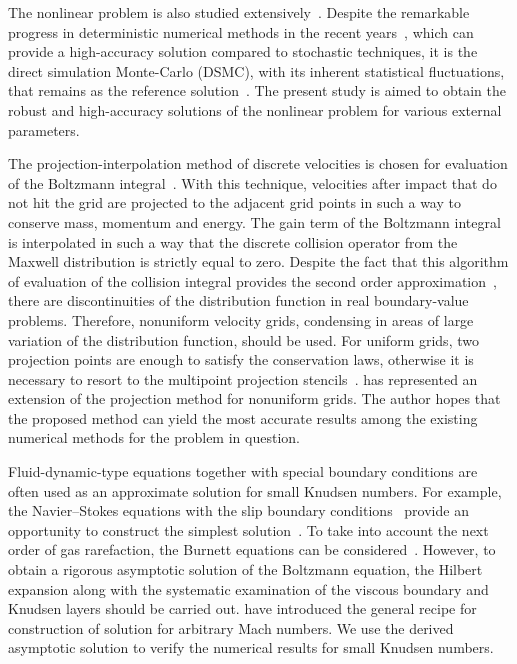 \documentclass[]{jfm}
\begin{document}
The nonlinear problem is also studied extensively~\citep{Garzo2003}.
Despite the remarkable progress in deterministic numerical methods
in the recent years~\citep[see e.g.][]{Dimarco2014,Mieussens2014},
which can provide a high-accuracy solution compared to stochastic techniques,
it is the direct simulation Monte-Carlo (DSMC), with its inherent statistical fluctuations,
that remains as the reference solution~\citep{Cercignani1994}.
The present study is aimed to obtain the robust and high-accuracy solutions
of the nonlinear problem for various external parameters.

The projection-interpolation method of discrete velocities is chosen for
evaluation of the Boltzmann integral~\citep{Tcheremissine1998, Tcheremissine2006}.
With this technique, velocities after impact that do not hit the grid
are projected to the adjacent grid points in such a way to conserve mass, momentum and energy.
The gain term of the Boltzmann integral is interpolated in such a way that
the discrete collision operator from the Maxwell distribution is strictly equal to zero.
Despite the fact that this algorithm of evaluation of the collision integral
provides the second order approximation~\citep{Anikin2012},
there are discontinuities of the distribution function in real boundary-value problems.
Therefore, nonuniform velocity grids, condensing in areas of large variation
of the distribution function, should be used.
For uniform grids, two projection points are enough to satisfy the conservation laws,
otherwise it is necessary to resort to the multipoint projection stencils~\citep{Dodulad2012}.
\citet{Dodulad2015} has represented an extension of the projection method for nonuniform grids.
The author hopes that the proposed method can yield the most accurate results
among the existing numerical methods for the problem in question.

Fluid-dynamic-type equations together with special boundary conditions
are often used as an approximate solution for small Knudsen numbers.
For example, the Navier--Stokes equations with the slip boundary conditions~\citep{Ohwada1989a}
provide an opportunity to construct the simplest solution~\citep{Sharipov2000}.
To take into account the next order of gas rarefaction,
the Burnett equations can be considered~\citep{Reese2003}.
However, to obtain a rigorous asymptotic solution of the Boltzmann equation,
the Hilbert expansion along with the systematic examination of the viscous boundary and Knudsen layers
should be carried out. \citet{Sone2000} have introduced the general recipe
for construction of solution for arbitrary Mach numbers.
We use the derived asymptotic solution to verify the numerical results for small Knudsen numbers.
\end{document}
